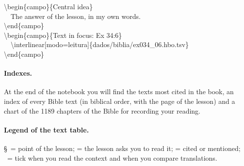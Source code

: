 \begin{nota}
\small\ttfamily
\textbackslash begin\{campo\}\{Central idea\}\\
\ \ The answer of the lesson, in my own words.\\
\textbackslash end\{campo\}\\
\textbackslash begin\{campo\}\{Text in focus: Ex 34:6\}\\
\ \ \textbackslash interlinear[modo=leitura]\{dados/biblia/ex034\_06.hbo.tsv\}\\
\textbackslash end\{campo\}
\end{nota}

\paragraph{Indexes.} At the end of the notebook you will find the texts most
cited in the book, an index of every Bible text (in biblical order, with the
page of the lesson) and a chart of the 1189 chapters of the Bible for
recording your reading.

\paragraph{Legend of the text table.}
\S\ = point of the lesson;  = the lesson asks you to read it;
 = cited or mentioned; \EBcaixa\ = tick when you read the
context and when you compare translations.
